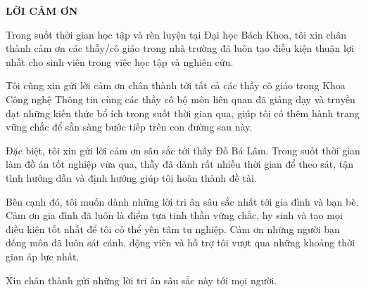 \documentclass[../DoAn.tex]{subfiles}
\begin{document}
\begin{center}
    \Large{\textbf{LỜI CẢM ƠN}}\\
\end{center}
\vspace{1cm}
Trong suốt thời gian học tập và rèn luyện tại Đại học Bách Khoa, tôi xin chân thành cảm ơn các thầy/cô giáo trong nhà trường đã luôn tạo điều kiện thuận lợi nhất cho sinh viên trong việc học tập và nghiên cứu.

Tôi cũng xin gửi lời cảm ơn chân thành tới tất cả các thầy cô giáo trong Khoa Công nghệ Thông tin cùng các thầy cô bộ môn liên quan đã giảng dạy và truyền đạt những kiến thức bổ ích trong suốt thời gian qua, giúp tôi có thêm hành trang vững chắc để sẵn sàng bước tiếp trên con đường sau này.

Đặc biệt, tôi xin gửi lời cảm ơn sâu sắc tới thầy Đỗ Bá Lâm. Trong suốt thời gian làm đồ án tốt nghiệp vừa qua, thầy đã dành rất nhiều thời gian để theo sát, tận tình hướng dẫn và định hướng giúp tôi hoàn thành đề tài.

Bên cạnh đó, tôi muốn dành những lời tri ân sâu sắc nhất tới gia đình và bạn bè. Cảm ơn gia đình đã luôn là điểm tựa tinh thần vững chắc, hy sinh và tạo mọi điều kiện tốt nhất để tôi có thể yên tâm tu nghiệp. Cảm ơn những người bạn đồng môn đã luôn sát cánh, động viên và hỗ trợ tôi vượt qua những khoảng thời gian áp lực nhất.

Xin chân thành gửi những lời tri ân sâu sắc này tới mọi người.
\end{document}
